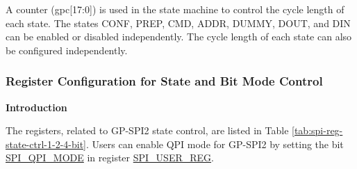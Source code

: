 \documentclass[main\_\_EN.tex]{subfiles}
\begin{document}
A counter (gpc[17:0]) is used in the state machine to control the cycle length of each state. The states CONF, PREP, CMD, ADDR, DUMMY, DOUT, and DIN can be enabled or disabled independently. The cycle length of each state can also be configured independently.

\subsubsection{Register Configuration for State and Bit Mode Control} \label{sec:spi-reg-config-state-bit-mode-ctrl}

\textbf{Introduction}

The registers, related to GP-SPI2 state control, are listed in Table \ref{tab:spi-reg-state-ctrl-1-2-4-bit}. Users can enable QPI mode for GP-SPI2 by setting the bit \hyperref[fielddesc:SPIQPIMODE]{SPI\_QPI\_MODE} in register \hyperref[regdesc:SPIUSERREG]{SPI\_USER\_REG}.
\end{document}
